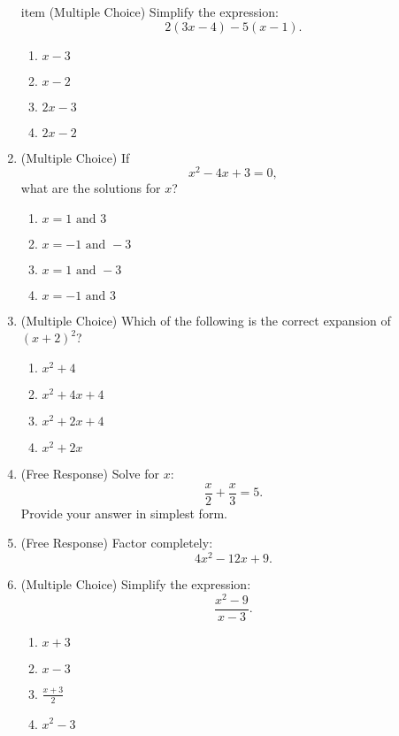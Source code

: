 \documentclass[12pt]{article}
\begin{document}
\begin{enumerate}[label=\textbf{Question \arabic*:}]
item (Multiple Choice) Simplify the expression:
    \[
    2(3x - 4) - 5(x - 1).
    \]
    \begin{enumerate}[label=(\Alph*)]
      \item \(x - 3\)
      \item \(x - 2\)
      \item \(2x - 3\)
      \item \(2x - 2\)
    \end{enumerate}
    
  \item (Multiple Choice) If 
    \[
    x^2 - 4x + 3 = 0,
    \]
    what are the solutions for \(x\)?
    \begin{enumerate}[label=(\Alph*)]
      \item \(x = 1 \text{ and } 3\)
      \item \(x = -1 \text{ and } -3\)
      \item \(x = 1 \text{ and } -3\)
      \item \(x = -1 \text{ and } 3\)
    \end{enumerate}
    
  \item (Multiple Choice) Which of the following is the correct expansion of \((x + 2)^2\)?
    \begin{enumerate}[label=(\Alph*)]
      \item \(x^2 + 4\)
      \item \(x^2 + 4x + 4\)
      \item \(x^2 + 2x + 4\)
      \item \(x^2 + 2x\)
    \end{enumerate}
    
  \item (Free Response) Solve for \(x\):
    \[
    \frac{x}{2} + \frac{x}{3} = 5.
    \]
    Provide your answer in simplest form.
    
  \item (Free Response) Factor completely:
    \[
    4x^2 - 12x + 9.
    \]

    \item (Multiple Choice) Simplify the expression:
    \[
    \frac{x^2-9}{x-3}.
    \]
    \begin{enumerate}[label=(\Alph*)]
      \item \(x+3\)
      \item \(x-3\)
      \item \(\frac{x+3}{2}\)
      \item \(x^2-3\)
    \end{enumerate}
    

\end{enumerate}
\end{document}
